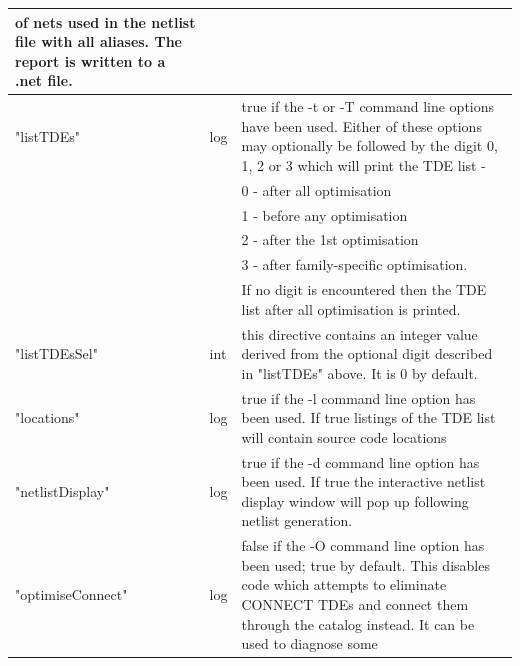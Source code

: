 \begin{tabular}{| l | l | p{10.0cm} |}
                                     of nets used in the netlist file with
                                     all aliases. The report is written to
                                     a .net file.
        \\ \hline
        "listTDEs"          & log &  true if the -t or -T command line options
                                     have been used. Either of these options
                                     may optionally be followed by the digit
                                     0, 1, 2 or 3 which will print the TDE list -\\
                                     & & 0 - after all optimisation \\
                                     & & 1 - before any optimisation \\
                                     & & 2 - after the 1st optimisation \\
                                     & & 3 - after family-specific optimisation. \\
                                     & & If no digit is encountered then the TDE list
                                     after all optimisation is printed.
        \\ \hline
        "listTDEsSel"       & int &  this directive contains an integer value
                                     derived from the optional digit described
                                     in "listTDEs" above. It is 0 by default.
        \\ \hline
        "locations"         & log &  true if the -l command line option has
                                     been used. If true listings of the TDE
                                     list will contain source code locations
        \\ \hline
        "netlistDisplay"    & log &  true if the -d command line option has
                                     been used. If true the interactive
                                     netlist display window will pop up
                                     following netlist generation.
        \\ \hline
        "optimiseConnect"   & log &  false if the -O command line option has
                                     been used; true by default. This disables
                                     code which attempts to eliminate CONNECT
                                     TDEs and connect them through the catalog
                                     instead. It can be used to diagnose some

\end{tabular}
